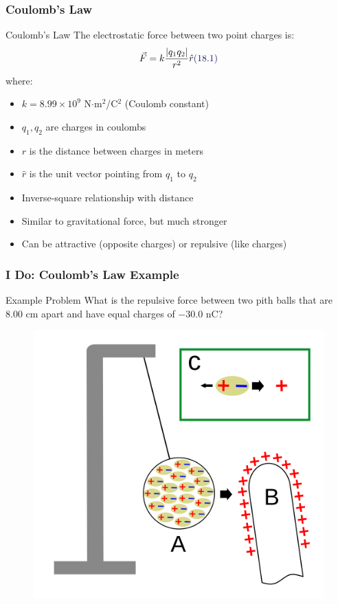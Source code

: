 \documentclass{beamer}
\newcommand{\highlight}[1]{\textcolor{ds9red}{#1}}
\newcommand{\eqnlabel}[1]{\textcolor{ds9blue}{(#1)}}
\begin{document}
\begin{frame}
    \frametitle{Coulomb's Law}
    
    \begin{block}{Coulomb's Law}
        The electrostatic force between two point charges is:
        \begin{equation}
            \vec{F} = k\frac{|q_1 q_2|}{r^2}\hat{r} \eqnlabel{18.1}
        \end{equation}
        where:
        \begin{itemize}
            \item $k = 8.99 \times 10^9$ N$\cdot$m$^2$/C$^2$ (Coulomb constant)
            \item $q_1, q_2$ are charges in coulombs
            \item $r$ is the distance between charges in meters
            \item $\hat{r}$ is the unit vector pointing from $q_1$ to $q_2$
        \end{itemize}
    \end{block}
    
    \begin{itemize}
        \item \highlight{Inverse-square} relationship with distance
        \item Similar to gravitational force, but \highlight{much stronger}
        \item Can be \highlight{attractive} (opposite charges) or \highlight{repulsive} (like charges)
    \end{itemize}
\end{frame}

\begin{frame}
    \frametitle{I Do: Coulomb's Law Example}
    
    \begin{exampleblock}{Example Problem}
        What is the repulsive force between two pith balls that are 8.00 cm apart and have equal charges of $-30.0$ nC?
    \end{exampleblock}
    \pause

    \begin{figure}
        \centering
        \includegraphics[width=0.4\linewidth]{Pith_ball_electroscope_operating_principle.svg.png}
    \end{figure}
\end{frame}
        
\end{document}
